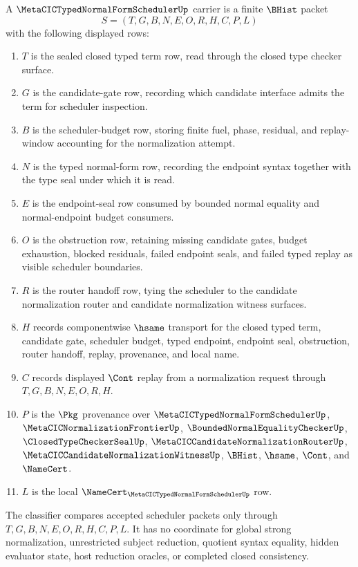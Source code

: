 \begin{definition}
\label{def:metacic-typed-normal-form-scheduler-carrier}
A $\MetaCICTypedNormalFormSchedulerUp$ carrier is a finite $\BHist$ packet
$$
S=(T,G,B,N,E,O,R,H,C,P,L)
$$
with the following displayed rows:
\begin{enumerate}
\item $T$ is the sealed closed typed term row, read through the closed type checker surface.
\item $G$ is the candidate-gate row, recording which candidate interface admits the term for scheduler inspection.
\item $B$ is the scheduler-budget row, storing finite fuel, phase, residual, and replay-window accounting for the normalization attempt.
\item $N$ is the typed normal-form row, recording the endpoint syntax together with the type seal under which it is read.
\item $E$ is the endpoint-seal row consumed by bounded normal equality and normal-endpoint budget consumers.
\item $O$ is the obstruction row, retaining missing candidate gates, budget exhaustion, blocked residuals, failed endpoint seals, and failed typed replay as visible scheduler boundaries.
\item $R$ is the router handoff row, tying the scheduler to the candidate normalization router and candidate normalization witness surfaces.
\item $H$ records componentwise $\hsame$ transport for the closed typed term, candidate gate, scheduler budget, typed endpoint, endpoint seal, obstruction, router handoff, replay, provenance, and local name.
\item $C$ records displayed $\Cont$ replay from a normalization request through $T,G,B,N,E,O,R,H$.
\item $P$ is the $\Pkg$ provenance over $\MetaCICTypedNormalFormSchedulerUp$, $\MetaCICNormalizationFrontierUp$, $\BoundedNormalEqualityCheckerUp$, $\ClosedTypeCheckerSealUp$, $\MetaCICCandidateNormalizationRouterUp$, $\MetaCICCandidateNormalizationWitnessUp$, $\BHist$, $\hsame$, $\Cont$, and $\NameCert$.
\item $L$ is the local $\NameCert_{\MetaCICTypedNormalFormSchedulerUp}$ row.
\end{enumerate}
The classifier compares accepted scheduler packets only through $T,G,B,N,E,O,R,H,C,P,L$. It has no coordinate for global strong normalization, unrestricted subject reduction, quotient syntax equality, hidden evaluator state, host reduction oracles, or completed closed consistency.
\end{definition}


